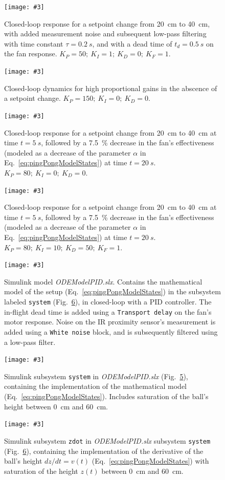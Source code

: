 \documentclass[10pt,twoside,openright]{article}
\newcommand{\mijnfiguur}[5][ht]{            %
    \begin{figure}[#1]                      %
        \begin{center}                      %
            \texttt{[image: \#3]}        %
        \end{center}
        \caption{#4\label{#5}}          %
    \end{figure}
    }
\begin{document}
\mijnfiguur[h!]{width=\linewidth}{tuned_PID4.pdf}{Closed-loop response for a setpoint change from 20~cm to 40~cm, with added measurement noise and subsequent low-pass filtering with time constant $\tau=0.2~s$, and with a dead time of $t_d=0.5~s$ on the fan response. $K_P=50;~ K_I=1;~ K_D=0;~K_F=1$.}{fig:tuned_PID4}

\mijnfiguur[h!]{width=\linewidth}{tuned_PID5.pdf}{Closed-loop dynamics for high proportional gains in the abscence of a setpoint change. $K_P=150;~ K_I=0;~ K_D=0$.}{fig:tuned_PID5}

\mijnfiguur[h!]{width=\linewidth}{tuned_PID6.pdf}{Closed-loop response for a setpoint change from 20~cm to 40~cm at time $t=5~s$, followed by a 7.5~\% decrease in the fan's effectiveness (modeled as a decrease of the parameter $\alpha$ in Eq.~\ref{eq:pingPongModelStates}) at time $t=20~s$. $K_P=80;~ K_I=0;~ K_D=0$.}{fig:tuned_PID6}

\mijnfiguur[h!]{width=\linewidth}{tuned_PID7.pdf}{Closed-loop response for a setpoint change from 20~cm to 40~cm at time $t=5~s$, followed by a 7.5~\% decrease in the fan's effectiveness (modeled as a decrease of the parameter $\alpha$ in Eq.~\ref{eq:pingPongModelStates}) at time $t=20~s$. $K_P=80;~ K_I=10;~ K_D=50;~K_F=1$.}{fig:tuned_PID7}

\mijnfiguur[h!]{width=\linewidth}{ODEModelPID.pdf}{Simulink model \textit{ODEModelPID.slx}. Contains the mathematical model of the setup (Eq.~\ref{eq:pingPongModelStates}) in the subsystem labeled \texttt{system} (Fig.~\ref{fig:ODEModelPID_system}), in closed-loop with a PID controller. The in-flight dead time is added using a \texttt{Transport delay} on the fan's motor response. Noise on the IR proximity sensor's measurement is added using a \texttt{White noise} block, and is subsequently filtered using a low-pass filter.}{fig:ODEModelPID}

\mijnfiguur[h!]{width=\linewidth}{ODEModelPID_system.pdf}{Simulink subsystem \texttt{system} in \textit{ODEModelPID.slx} (Fig.~\ref{fig:ODEModelPID}), containing the implementation of the mathematical model (Eq.~\ref{eq:pingPongModelStates}). Includes saturation of the ball's height between 0~cm and 60~cm.}{fig:ODEModelPID_system}

\mijnfiguur[h!]{width=\linewidth}{ODEModelPID_zdot.pdf}{Simulink subsystem \texttt{zdot} in \textit{ODEModelPID.slx} subsystem \texttt{system} (Fig.~\ref{fig:ODEModelPID_system}), containing the implementation of the derivative of the ball's height $dz/dt = v(t)$ (Eq.~\ref{eq:pingPongModelStates}) with saturation of the height $z(t)$ between 0~cm and 60~cm.}{fig:ODEModelPID_zdot}
\end{document}
